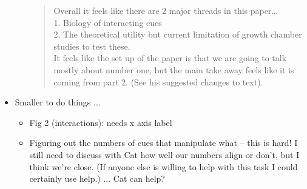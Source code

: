 \documentclass[11pt,letterpaper]{article}
\begin{document}
\begin{itemize}
\begin{itemize}
\begin{quote}
Overall it feels like there are 2 major threads in this paper…\\
1. Biology of interacting cues\\
2. The theoretical utility but current limitation of growth chamber studies to test these.\\
It feels like the set up of the paper is that we are going to talk mostly about number one, but the main take away feels like it is coming from part 2. (See his suggested changes to text).
\end{quote}
\end{itemize}
\item Smaller to do things ...
\begin{itemize}
\item Fig 2 (interactions): needs x axis label
\item Figuring out the numbers of cues that manipulate what -- this is
hard! I still need to discuss with Cat how well our numbers align or
don't, but I think we're close. (If anyone else is willing to help with
this task I could certainly use help.) ... Cat can help?
\end{itemize}
\end{itemize}
\end{document}
